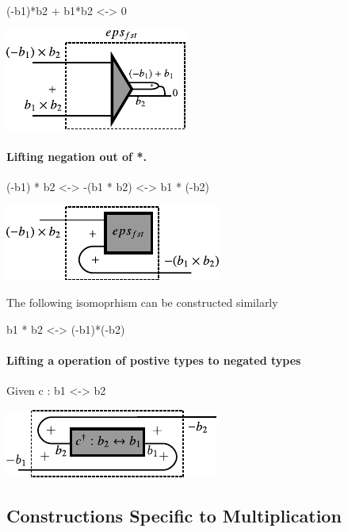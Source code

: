 \documentclass[preprint]{sigplanconf}
\begin{document}
{{(-b1)*b2 + b1*b2 <-> 0}}

\begin{center}
  \includegraphics{diagrams/eps_fst.pdf}
\end{center}

\paragraph*{Lifting negation out of {{*}}. }

{{(-b1) * b2 <-> -(b1 * b2) <-> b1 * (-b2)}}

\begin{center}
  \includegraphics{diagrams/mult_neg.pdf}
\end{center}

The following isomoprhism can be constructed similarly 

{{b1 * b2 <-> (-b1)*(-b2)}}


\paragraph*{Lifting a operation of postive types to negated types}

Given {{c : b1 <-> b2}}

\begin{center}
  \includegraphics{diagrams/neg_lift.pdf}
\end{center}


\subsection{Constructions Specific to Multiplication}
\end{document}
